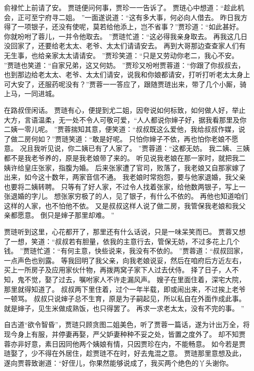 俞禄忙上前请了安。
贾琏便问何事，贾珍一一告诉了。
贾琏心中想道：“趁此机会，正可至宁府寻二姐。
”一面遂说道：“这有多大事，何必向人借去。
昨日我方得了一项银子，还没有使呢，莫若给他添上，岂不省事？”贾珍道：“如此甚好。
你就吩咐了蓉儿，一并令他取去。
”贾琏忙道：“这必得我亲身取去。
再我这几日没回家了，还要给老太太、老爷、太太们请请安去。
再到大哥那边查查家人们有无生事，也给亲家太太请请安。
”贾珍笑道：“只是又劳动你老二，我心不安。
”贾琏也笑道：“自家兄弟，这又何妨。
”贾珍又吩咐贾蓉道：“你跟了你叔叔去，也到那边给老太太、老爷、太太们请安，说我和你娘都请安，打听打听老太太身上可大安了，还服药呢没有？”贾蓉一一答应了，跟随贾琏出来，带了几个小厮，骑上马，一同进城。
\par
在路叔侄闲话。
贾琏有心，便提到尤二姐，因夸说如何标致，如何做人好，举止大方，言语温柔，无一处不令人可敬可爱，“人人都说你婶子好，据我看那里及你二姨一零儿呢。
”贾蓉揣知其意，便笑道：“叔叔既这么爱他，我给叔叔作媒，说了做二房何如？”贾琏笑道：“敢是好呢。
只怕你婶子不依，再也怕你老娘不愿意。
况且我听见说，你二姨已有了人家了。
”贾蓉道：“这都无妨。
我二姨、三姨都不是我老爷养的，原是我老娘带了来的。
听见说我老娘在那一家时，就把我二姨许给皇庄张家，指腹为婚。
后来张家遭了官司，败落了，我老娘又自那家嫁了出来，如今这十数年，两家音信不通。
我老娘时常抱怨，要与他家退婚，我父亲也要将二姨转聘。
只等有了好人家，不过令人找着张家，给他数两银子，写上一张退婚的字儿。
想张家穷极了的人，见了银子，有什么不依的。
再他也知道咱们这样的人家，也不怕他不依。
又是叔叔这样人说了做二房，我管保我老娘和我父亲都愿意。
倒只是婶子那里却难。
”\par
贾琏听到这里，心花都开了，那里还有什么话说，只是一味呆笑而已。
贾蓉又想了一想，笑道：“叔叔若有胆量，依我的主意行去，管保无妨，不过多花上几个钱。
”贾琏忙道：“有何主意，快些说来，我没有不依的。
”贾蓉道：“叔叔回家，一点声色也别露。
等我回明了我父亲，向我老娘说妥，然后在咱府后方近左右，买上一所房子及应用家伙什物，再拨两窝子家下人过去伏侍。
择了日子，人不知，鬼不觉，娶了过去，嘱咐家人不许走漏风声。
嫂子在里面住着，深宅大院，那里就得知道了。
叔叔两下里住着，过个一年半载，即或闹出来，不过挨上老爷一顿骂。
叔叔只说婶子总不生育，原是为子嗣起见，所以私自在外面作成此事。
就是婶子，见生米做成熟饭，也只得罢了。
再求一求老太太，没有不完的事。
”\par
自古道“欲令智昏”，贾琏只顾贪图二姐美色，听了贾蓉一篇话，遂为计出万全，将现今身上有服，并停妻再娶，严父妒妻种种不妥之处，皆置之度外了。
却不知贾蓉亦非好意，素日因同他两个姨娘有情，只因贾珍在内，不能畅意。
如今若是贾琏娶了，少不得在外居住，趁贾琏不在时，好去鬼混之意。
贾琏那里意想及此，遂向贾蓉致谢道：“好侄儿，你果然能够说成了，我买两个绝色的丫头谢你。
